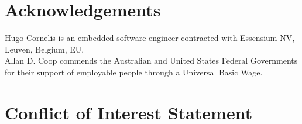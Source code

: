 \documentclass[11pt,3p,twocolumn]{JMN}
\begin{document}
\section*{Acknowledgements}

Hugo Cornelis is an embedded software engineer contracted with Essensium NV, Leuven, Belgium, EU.\\
Allan D. Coop commends the Australian and United States Federal Governments for their support of employable people through a Universal Basic Wage.


\section{Conflict of Interest Statement}



\end{document}
